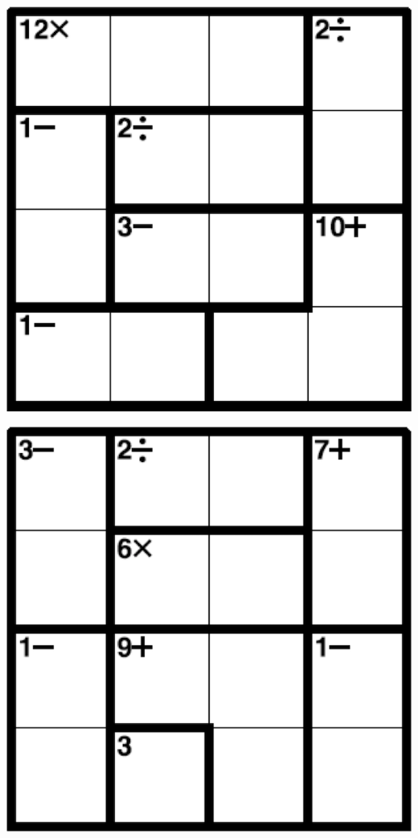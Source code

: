 
\includegraphics[scale=1]{Gambar/Lampiran/4x4_31.png}

\includegraphics[scale=1]{Gambar/Lampiran/4x4_32.png}
